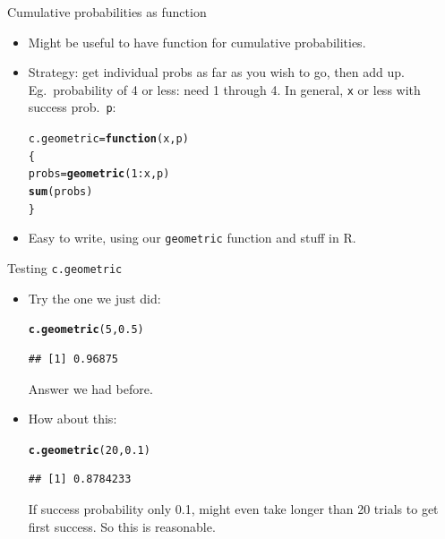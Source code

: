 \documentclass[unknownkeysallowed]{beamer}\usepackage[]{graphicx}\usepackage[]{color}
\makeatletter
\newcommand{\hlnum}[1]{\textcolor[rgb]{0.686,0.059,0.569}{#1}}%
\newcommand{\hlopt}[1]{\textcolor[rgb]{0,0,0}{#1}}%
\newcommand{\hlstd}[1]{\textcolor[rgb]{0.345,0.345,0.345}{#1}}%
\newcommand{\hlkwa}[1]{\textcolor[rgb]{0.161,0.373,0.58}{\textbf{#1}}}%
\newcommand{\hlkwb}[1]{\textcolor[rgb]{0.69,0.353,0.396}{#1}}%
\newcommand{\hlkwc}[1]{\textcolor[rgb]{0.333,0.667,0.333}{#1}}%
\newcommand{\hlkwd}[1]{\textcolor[rgb]{0.737,0.353,0.396}{\textbf{#1}}}%
\newenvironment{kframe}{%
 \def\at@end@of@kframe{}%
 \ifinner\ifhmode%
  \def\at@end@of@kframe{\end{minipage}}%
  \begin{minipage}{\columnwidth}%
 \fi\fi%
 \def\FrameCommand##1{\hskip\@totalleftmargin \hskip-\fboxsep
 \colorbox{shadecolor}{##1}\hskip-\fboxsep
     \hskip-\linewidth \hskip-\@totalleftmargin \hskip\columnwidth}%
 \MakeFramed {\advance\hsize-\width
   \@totalleftmargin\z@ \linewidth\hsize
   \@setminipage}}%
 {\par\unskip\endMakeFramed%
 \at@end@of@kframe}
\newenvironment{knitrout}{}{} %
\makeatother
\begin{document}
\begin{frame}[fragile]{Cumulative probabilities as function}

  \begin{itemize}
  \item Might be useful to have function for cumulative probabilities.
  \item Strategy: get individual probs as far as you wish to go, then
    add up. Eg.\ probability of 4 or less: need 1 through 4. In
    general, \texttt{x} or less with success prob.\ \texttt{p}:
\begin{knitrout}
\color{fgcolor}\begin{kframe}
\begin{alltt}
\hlstd{c.geometric}\hlkwb{=}\hlkwa{function}\hlstd{(}\hlkwc{x}\hlstd{,}\hlkwc{p}\hlstd{)}
  \hlstd{\{}
    \hlstd{probs}\hlkwb{=}\hlkwd{geometric}\hlstd{(}\hlnum{1}\hlopt{:}\hlstd{x,p)}
    \hlkwd{sum}\hlstd{(probs)}
  \hlstd{\}}
\end{alltt}
\end{kframe}
\end{knitrout}
\item Easy to write, using our \texttt{geometric} function and stuff
  in R.

  \end{itemize}
  
\end{frame}

\begin{frame}[fragile]{Testing \texttt{c.geometric}}

  \begin{itemize}
  \item Try the one we just did:
\begin{knitrout}
\color{fgcolor}\begin{kframe}
\begin{alltt}
\hlkwd{c.geometric}\hlstd{(}\hlnum{5}\hlstd{,}\hlnum{0.5}\hlstd{)}
\end{alltt}
\begin{verbatim}
## [1] 0.96875
\end{verbatim}
\end{kframe}
\end{knitrout}
Answer we had before.
\item How about this:
\begin{knitrout}
\color{fgcolor}\begin{kframe}
\begin{alltt}
\hlkwd{c.geometric}\hlstd{(}\hlnum{20}\hlstd{,}\hlnum{0.1}\hlstd{)}
\end{alltt}
\begin{verbatim}
## [1] 0.8784233
\end{verbatim}
\end{kframe}
\end{knitrout}
If success probability only 0.1, might even take longer than 20 trials
to get first success. So this is reasonable.

  \end{itemize}
  
\end{frame}
\end{document}
